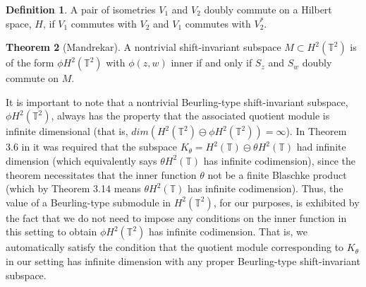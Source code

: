 \documentclass[12pt,reqno]{amsart}
\theoremstyle{definition}
\newtheorem{theorem}{Theorem} [section]
\theoremstyle{definition}
\newtheorem{definition}[theorem]{Definition}
\numberwithin{equation}{section}
\begin{document}
\begin{definition}
A pair of isometries $V_1$ and $V_2$ doubly commute on a Hilbert space, $H$, if $V_1$ commutes with $V_2$ and $V_1$ commutes with $V_2^{*}$.
\end{definition}

\begin{theorem}[Mandrekar]
A nontrivial shift-invariant subspace $M \subset H^2(\mathbb{T}^2)$ is of the form $\phi H^2(\mathbb{T}^2)$ with $\phi(z,w)$ inner if and only if $S_z$ and $S_w$ doubly commute on $M$.
 \end{theorem}

It is important to note that a nontrivial Beurling-type shift-invariant subspace, $\phi H^2(\mathbb{T}^2)$,  always has the property that the associated quotient module is infinite dimensional (that is, $dim(H^2(\mathbb{T}^2) \ominus \phi H^2(\mathbb{T}^2)) = \infty$). In Theorem 3.6 in \cite{CHP20} it was required that the subspace $K_\theta = H^2(\mathbb{T}) \ominus \theta H^2(\mathbb{T})$ had infinite dimension (which equivalently says $\theta H^2(\mathbb{T})$ has infinite codimension), since the theorem necessitates that the inner function $\theta$ not be a finite Blaschke product (which by Theorem 3.14 \cite{RR03} means $\theta H^2(\mathbb{T})$ has infinite codimension). 
Thus, the value of a Beurling-type submodule in $H^2(\mathbb{T}^2)$, for our purposes, is exhibited by the fact that we do not need to impose any conditions on the inner function in this setting to obtain $\phi H^2(\mathbb{T}^2)$ has infinite codimension. That is, we automatically satisfy the condition that the quotient module corresponding to $K_\theta$ in our setting has infinite dimension with any proper Beurling-type shift-invariant subspace. %
\end{document}
